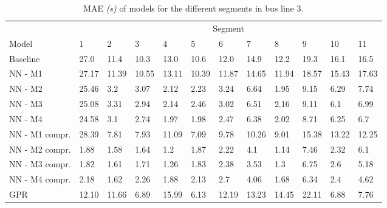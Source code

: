 \begin{table}[H]
  \centering
  \caption{MAE \textit{(s)} of models for the different segments in bus line 3.}
  \label{tbl:model-mae-of-segs-203}
  \begin{adjustbox}{center}
  \begin{tabular}{ l | l | l | l | l | l | l | l | l | l | l | l }
    & \multicolumn{11}{c}{Segment} \\
    Model       & 1 & 2 & 3 & 4 & 5 & 6 & 7 & 8 & 9 & 10 & 11 \\
    \hline
    Baseline  & 27.0 & 11.4 & 10.3 & 13.0 & 10.6 & 12.0 & 14.9 & 12.2 & 19.3 & 16.1  & 16.5 \\
    NN - M1        & 27.17& 11.39& 10.55& 13.11& 10.39& 11.87& 14.65& 11.94& 18.57& 15.43& 17.63\\
    NN - M2         & 25.46& 3.2& 3.07& 2.12& 2.23& 3.24& 6.64& 1.95& 9.15& 6.29& 7.74\\
    NN - M3        & 25.08& 3.31& 2.94& 2.14& 2.46& 3.02& 6.51& 2.16& 9.11& 6.1& 6.99\\
    NN - M4         & 24.58& 3.1& 2.74& 1.97& 1.98& 2.47& 6.38& 2.02& 8.71& 6.25& 6.7\\
    NN - M1 compr.         & 28.39& 7.81& 7.93& 11.09& 7.09& 9.78& 10.26& 9.01& 15.38& 13.22& 12.25 \\ 
    NN - M2 compr.         & 1.88& 1.58& 1.64& 1.2& 1.87& 2.22& 4.1& 1.14& 7.46& 2.32& 6.1 \\
    NN - M3 compr.         & 1.82& 1.61& 1.71& 1.26& 1.83& 2.38& 3.53& 1.3& 6.75& 2.6& 5.18 \\
    NN - M4 compr.         & 2.18& 1.62& 2.26& 1.88& 2.13& 2.7& 4.06& 1.68& 6.34& 2.4& 4.62 \\
    GPR            & 12.10 & 11.66 & 6.89 & 15.99 & 6.13  & 12.19 &  13.23 & 14.45 & 22.11 &  6.88 & 7.76 \\
  \end{tabular}
  \end{adjustbox}
\end{table}

